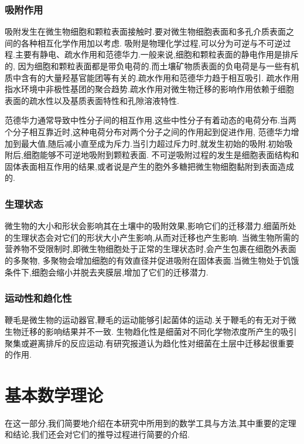 \documentclass[a4paper,cs4size,adobefonts,fancyhdr]{ctexart}[2005/11/25]
\begin{document}
\subsubsection{吸附作用}
吸附发生在微生物细胞和颗粒表面接触时.要对微生物细胞表面和多孔介质表面之间的各种相互化学作用加以考虑.
吸附是物理化学过程,可以分为可逆与不可逆过程.主要有静电、疏水作用和范德华力.一般来说,细胞和颗粒表面的静电作用是排斥的,
因为细胞和颗粒表面都是带负电荷的.而土壤矿物质表面的负电荷是与一些有机质中含有的大量羟基官能团等有关的.疏水作用和范德华力趋于相互吸引.
疏水作用指水环境中非极性基团的聚合趋势.疏水作用对微生物迁移的影响作用依赖于细胞表面的疏水性以及基质表面特性和孔隙溶液特性.\par
范德华力通常导致中性分子间的相互作用.这些中性分子有着动态的电荷分布.当两个分子相互靠近时,这种电荷分布对两个分子之间的作用起到促进作用,
范德华力增加到最大值,随后减小直至成为斥力.当引力超过斥力时,就发生初始的吸附.初始吸附后,细胞能够不可逆地吸附到颗粒表面.
不可逆吸附过程的发生是细胞表面结构和固体表面相互作用的结果,或者说是产生的胞外多糖把微生物细胞黏附到表面造成的.
\subsubsection{生理状态}
微生物的大小和形状会影响其在土壤中的吸附效果,影响它们的迁移潜力.细菌所处的生理状态会对它们的形状大小产生影响,从而对迁移也产生影响.
当微生物所需的营养物不受限制时,即微生物细胞处于正常的生理状态时,会产生包裹在细胞外表面的多聚物,
多聚物会增加细胞的有效直径并促进吸附在固体表面.当微生物处于饥饿条件下,细胞会缩小并脱去夹膜层,增加了它们的迁移潜力.
\subsubsection{运动性和趋化性}
鞭毛是微生物的运动器官,鞭毛的运动能够引起菌体的运动.关于鞭毛的有无对于微生物迁移的影响结果并不一致.
生物趋化性是细菌对不同化学物浓度所产生的吸引聚集或避离排斥的反应运动.有研究报道认为趋化性对细菌在土层中迁移起很重要的作用.
\section{基本数学理论}
在这一部分,我们简要地介绍在本研究中所用到的数学工具与方法,其中重要的定理和结论,我们还会对它们的推导过程进行简要的介绍.
\end{document}

